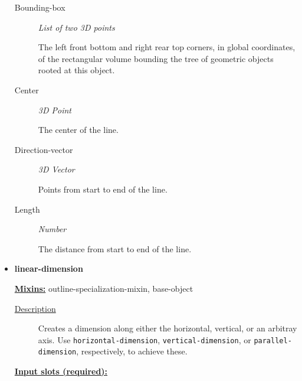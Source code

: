 \documentclass [11pt]{book}
\begin{document}
\begin{itemize}
\begin{description}
\item [Bounding-box]
\emph{List of two 3D points}

 The left front bottom and right rear top corners, in global coordinates,
of the rectangular volume bounding the tree of geometric objects rooted at this object.




\item [Center]
\emph{3D Point}

 The center of the line.




\item [Direction-vector]
\emph{3D Vector}

 Points from start to end of the line.




\item [Length]
\emph{Number}

 The distance from start to end of the line.




\end{description}







\item {}
\label{prim:linear-dimension}
\textbf{linear-dimension}


\textbf{
\underline{Mixins:}} outline-specialization-mixin, base-object





\begin{description}

\item [
\underline{Description}]


Creates a dimension along either the
horizontal, vertical, or an arbitray axis. Use
\texttt{horizontal-dimension}, \texttt{vertical-dimension}, or
\texttt{parallel-dimension}, respectively, to achieve these.



\end{description}








\textbf{
\underline{Input slots (required):}}

\begin{description}


\end{description}
\end{itemize}
\end{document}
